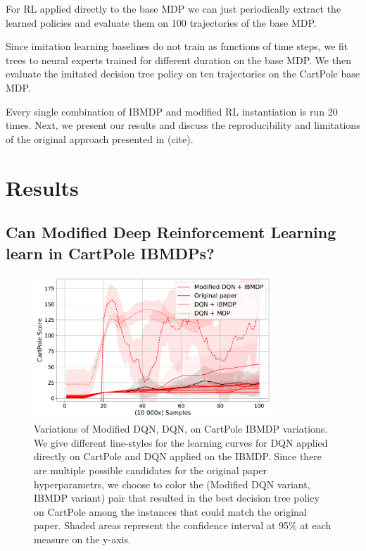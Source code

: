 For RL applied directly to the base MDP we can just periodically extract the learned policies and evaluate them on 100 trajectories of the base MDP.

Since imitation learning baselines do not train as functions of time steps, we fit trees to neural experts trained for different duration on the base MDP. 
We then evaluate the imitated decision tree policy on ten trajectories on the CartPole base MDP.

Every single combination of IBMDP and modified RL instantiation is run 20 times.
Next, we present our results and discuss the reproducibility and limitations of the original approach presented in (cite).

\section{Results}

\subsection{Can Modified Deep Reinforcement Learning learn in CartPole IBMDPs?}

\begin{figure}
    \centering
    \includegraphics[width=0.8\textwidth]{images/images_part1/dqn.pdf}
    \caption{Variations of Modified DQN, DQN, on CartPole IBMDP variations. We give different line-styles for the learning curves for DQN applied directly on CartPole and DQN applied on the IBMDP.
    Since there are multiple possible candidates for the original paper hyperparametrs, we choose to color the (Modified DQN variant, IBMDP variant) pair that resulted in the best decision tree policy on CartPole among the instances that could match the original paper.
    Shaded areas represent the confidence interval at 95\% at each measure on the y-axis.}
\end{figure}

